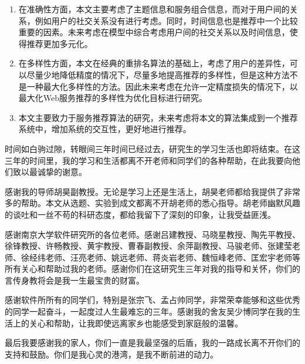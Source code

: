 \documentclass[master,winfonts]{njuthesis}
\begin{document}
\begin{enumerate}
\item 在准确性方面，本文主要考虑了主题信息和服务组合信息，而对于用户间的关系，例如用户的社交关系没有进行考虑。同时，时间信息也是推荐中一个比较重要的因素。未来考虑在模型中综合考虑用户间的社交关系以及时间信息，使得推荐更加多元化。

\item 在多样性方面，本文在经典的重排名算法的基础上，考虑了用户的差异性，可以尽量少地降低精度的情况下，尽量多地提高推荐的多样性，但是这种方法不是一种最大化多样性的方法。因此未来考虑在允许一定精度损失的情况下，以最大化Web服务推荐的多样性为优化目标进行研究。

\item 本文主要致力于服务推荐算法的研究，未来考虑将本文的算法集成到一个推荐系统中，增加系统的交互性，更好地进行推荐。

\end{enumerate}



\begin{acknowledgement}
时间如白驹过隙，转眼间三年时间已经过去，研究生的学习生活也即将结束。在这三年的时间里，我的学习和生活都离不开老师和同学们的各种帮助，在此我要向他们致以最诚挚的谢意。

感谢我的导师胡昊副教授。无论是学习上还是生活上，胡昊老师都给我提供了非常多的帮助。本文从选题、实验到成文都离不开胡老师的悉心指导。胡老师幽默风趣的谈吐和一丝不苟的科研态度，都给我留下了深刻的印象，让我受益匪浅。

感谢南京大学软件研究所的各位老师。感谢吕建教授、马晓星教授、陶先平教授、徐锋教授、许畅教授、黄宇教授、曹春副教授、余萍副教授、马骏老师、张建莹老师、徐经纬老师、汪亮老师、姚远老师、蒋炎岩老师、魏恒峰老师、匡宏宇老师等所有关心和帮助过我的老师。感谢你们在这研究生三年对我的指导和关怀，你们的言传身教将会是我一生最宝贵的财富。

感谢软件所所有的同学们，特别是张宗飞、孟占帅同学，非常荣幸能够和这些优秀的同学一起奋斗，一起度过人生最难忘的三年。感谢我的舍友吴少博同学在我的生活上的关心和帮助，让我即使远离家乡也能感受到家庭般的温馨。

最后我要感谢我的家人，你们一直是我最坚强的后盾，我的一路成长离不开你们的支持和鼓励。你们是我心灵的港湾，是我不断前进的动力。
\end{acknowledgement}

\appendix
\end{document}
